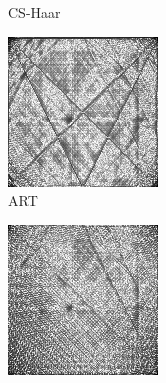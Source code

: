 \documentclass[journal]{IEEEtran}
\begin{document}
\begin{figure}[!h]
\begin{subfigure}[b]{0.24\linewidth}
        \caption{CS-Haar}
     \end{subfigure}
    \begin{subfigure}[b]{0.24\linewidth}
        \includegraphics[width=\textwidth]{../images/potato/post_tci/comparison/weightsIm_art30.png}
        \caption{ART}
     \end{subfigure}
    \begin{subfigure}[b]{0.24\linewidth}
        \includegraphics[width=\textwidth]{../images/potato/post_tci/comparison/weightsIm_sart30.png}

\end{subfigure}
\end{figure}
\end{document}
